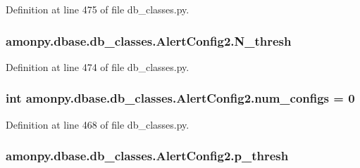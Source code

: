 Definition at line 475 of file db\-\_\-classes.\-py.

\hypertarget{classamonpy_1_1dbase_1_1db__classes_1_1_alert_config2_aa4e9d2584bdecbd5b2c7be15784c7684}{
\subsubsection[{N\-\_\-thresh}]{\setlength{\rightskip}{0pt plus 5cm}amonpy.\-dbase.\-db\-\_\-classes.\-Alert\-Config2.\-N\-\_\-thresh}}\label{classamonpy_1_1dbase_1_1db__classes_1_1_alert_config2_aa4e9d2584bdecbd5b2c7be15784c7684}


Definition at line 474 of file db\-\_\-classes.\-py.

\hypertarget{classamonpy_1_1dbase_1_1db__classes_1_1_alert_config2_a17be669e8bdfa435ca0fe275a71479dd}{
\subsubsection[{num\-\_\-configs}]{\setlength{\rightskip}{0pt plus 5cm}int amonpy.\-dbase.\-db\-\_\-classes.\-Alert\-Config2.\-num\-\_\-configs = 0\hspace{0.3cm}{\ttfamily [static]}}}\label{classamonpy_1_1dbase_1_1db__classes_1_1_alert_config2_a17be669e8bdfa435ca0fe275a71479dd}


Definition at line 468 of file db\-\_\-classes.\-py.

\hypertarget{classamonpy_1_1dbase_1_1db__classes_1_1_alert_config2_a8dbc3ae517192b47243d9cc10549c928}{
\subsubsection[{p\-\_\-thresh}]{\setlength{\rightskip}{0pt plus 5cm}amonpy.\-dbase.\-db\-\_\-classes.\-Alert\-Config2.\-p\-\_\-thresh}}\label{classamonpy_1_1dbase_1_1db__classes_1_1_alert_config2_a8dbc3ae517192b47243d9cc10549c928}


